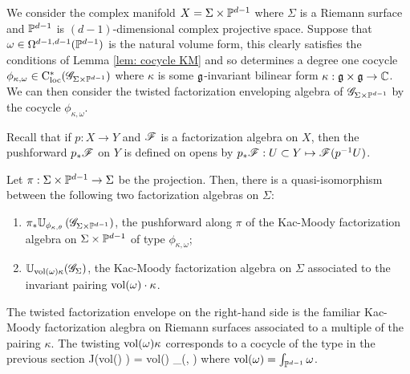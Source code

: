\begin{eg}
We consider the complex manifold $X = \Sigma \times \mathbb P^{d-1}$ where $\Sigma$ is a Riemann surface and $\mathbb P^{d-1}$ is $(d-1)$-dimensional complex projective space.
Suppose that $\omega \in \Omega^{d-1,d-1}(\mathbb P^{d-1})$ is the natural volume form, this clearly satisfies the conditions of Lemma \ref{lem: cocycle KM} and so determines a degree one cocycle $\phi_{\kappa, \omega} \in {\rm C}_{\rm loc}^*(\mathscr G_{\Sigma \times \mathbb P^{d-1}})$ where $\kappa$ is some $\mathfrak g$-invariant bilinear form $\kappa : \mathfrak g \times \mathfrak g \to \mathbb C$. 
We can then consider the twisted factorization enveloping algebra of $\mathscr G_{\Sigma \times \mathbb P^{d-1}}$ by the cocycle $\phi_{\kappa, \omega}$. 

Recall that if $p : X \to Y$ and $\mathscr F$ is a factorization algebra on $X$, then the pushforward $p_* \mathscr F$ on $Y$ is defined on opens by $p_* \mathscr F : U \subset Y \mapsto \mathscr F(p^{-1} U)$. 

\begin{prop}
Let $\pi : \Sigma \times \mathbb P^{d-1} \to \Sigma$ be the projection. 
Then, there is a quasi-isomorphism between the following two factorization algebras on $\Sigma$:
\begin{enumerate}
\item $\pi_* \mathbb U_{\phi_{\kappa, \theta}} \left(\mathscr G_{\Sigma \times \mathbb P^{d-1}}\right)$, the pushforward along $\pi$ of the Kac-Moody factorization algebra on $\Sigma \times \mathbb P^{d-1}$ of type $\phi_{\kappa,\omega}$;
\item $\mathbb U_{{\rm vol}(\omega) \kappa} (\mathscr G_\Sigma)$, the Kac-Moody factorization algebra on $\Sigma$ associated to the invariant pairing ${\rm vol}(\omega) \cdot \kappa$. 
\end{enumerate}
\end{prop}

The twisted factorization envelope on the right-hand side is the familiar Kac-Moody factorization alegbra on Riemann surfaces associated to a multiple of the pairing $\kappa$.
The twisting ${\rm vol}(\omega) \kappa$ corresponds to a cocycle of the type in the previous section 
\ben
J({\rm vol}(\omega) \kappa) = {\rm vol}(\omega) \int_\Sigma \kappa(\alpha, \partial \beta)
\een
where ${\rm vol}(\omega) = \int_{\mathbb P^{d-1}} \omega$. 


\end{eg}
